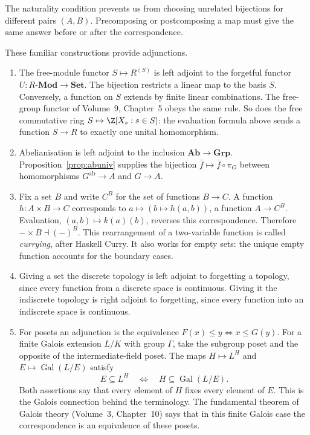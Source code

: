 The naturality condition prevents us from choosing unrelated bijections for different pairs $(A,B)$. Precomposing or postcomposing a map must give the same answer before or after the correspondence.

\begin{example}\label{ex:adjunctions}
These familiar constructions provide adjunctions.
\begin{enumerate}[label=(\alph*)]
\item The free-module functor $S\mapsto R^{(S)}$ is left adjoint to the forgetful functor $U:R\text{-}\mathbf{Mod}\to\mathbf{Set}$. The bijection restricts a linear map to the basis $S$. Conversely, a function on $S$ extends by finite linear combinations. The free-group functor of Volume~9, Chapter~5 obeys the same rule. So does the free commutative ring $S\mapsto\Z[X_s:s\in S]$: the evaluation formula above sends a function $S\to R$ to exactly one unital homomorphism.
\item Abelianisation is left adjoint to the inclusion $\mathbf{Ab}\to\mathbf{Grp}$. Proposition~\ref{prop:abuniv} supplies the bijection $\bar f\mapsto\bar f\circ\pi_G$ between homomorphisms $G^{\mathrm{ab}}\to A$ and $G\to A$.
\item Fix a set $B$ and write $C^B$ for the set of functions $B\to C$. A function $h:A\times B\to C$ corresponds to $a\mapsto(b\mapsto h(a,b))$, a function $A\to C^B$. Evaluation, $(a,b)\mapsto k(a)(b)$, reverses this correspondence. Therefore $-\times B\dashv(-)^B$. This rearrangement of a two-variable function is called \emph{currying}, after Haskell Curry. It also works for empty sets: the unique empty function accounts for the boundary cases.
\item Giving a set the discrete topology is left adjoint to forgetting a topology, since every function from a discrete space is continuous. Giving it the indiscrete topology is right adjoint to forgetting, since every function into an indiscrete space is continuous.
\item For posets an adjunction is the equivalence $F(x)\le y\iff x\le G(y)$. For a finite Galois extension $L/K$ with group $\Gamma$, take the subgroup poset and the opposite of the intermediate-field poset. The maps $H\mapsto L^H$ and $E\mapsto\operatorname{Gal}(L/E)$ satisfy
\[
E\subseteq L^H\quad\Longleftrightarrow\quad H\subseteq\operatorname{Gal}(L/E).
\]
Both assertions say that every element of $H$ fixes every element of $E$. This is the Galois connection behind the terminology. The fundamental theorem of Galois theory (Volume~3, Chapter~10) says that in this finite Galois case the correspondence is an equivalence of these posets.
\end{enumerate}
\end{example}


